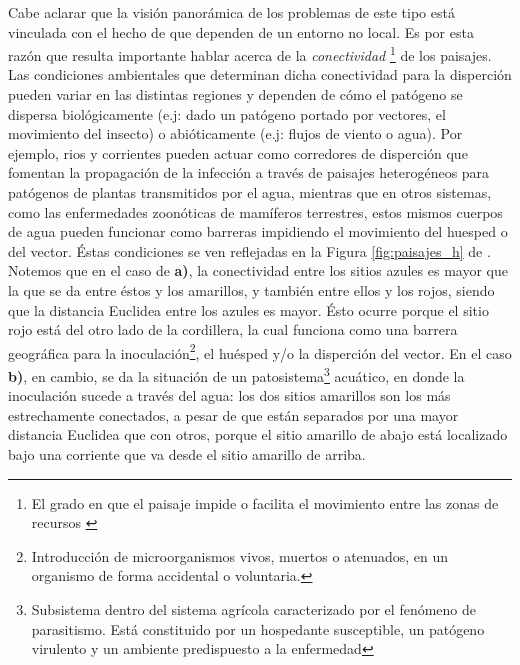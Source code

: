 \par Cabe aclarar que la visión panorámica de los problemas de este tipo está
  vinculada con el hecho de que dependen de un entorno no local. Es por esta
  razón que resulta importante hablar acerca de la \textit{conectividad}
  \footnote{El grado en que el paisaje impide o facilita el movimiento
  entre las zonas de recursos \cite{landscape_connectivity}} de los paisajes.
  Las condiciones ambientales que determinan dicha conectividad
  para la disperción pueden variar en las distintas regiones y dependen de cómo
  el patógeno se dispersa biológicamente (e.j: dado un patógeno portado por
  vectores, el movimiento del insecto) o abióticamente (e.j: flujos de viento o agua).
  Por ejemplo, rios y corrientes pueden actuar como corredores de disperción que
  fomentan la propagación de la infección a través de paisajes heterogéneos
  para patógenos de plantas transmitidos por el agua, mientras que en otros
  sistemas, como las enfermedades zoonóticas de mamíferos terrestres, estos mismos
  cuerpos de agua pueden funcionar como barreras impidiendo el movimiento
  del huesped o del vector. Éstas condiciones se ven reflejadas en la
  Figura \ref{fig:paisajes_h} de \cite{landscape_epidemiology}.
  Notemos que en el caso de \textbf{a)}, la
  conectividad entre los sitios azules es mayor que la que se da entre éstos y
  los amarillos, y también entre ellos y los rojos, siendo que la distancia
  Euclidea entre los azules es mayor. Ésto ocurre porque el sitio rojo está del otro lado
  de la cordillera, la cual funciona como una barrera geográfica para la
  inoculación\footnote{Introducción de microorganismos vivos, muertos o atenuados,
  en un organismo de forma accidental o voluntaria.}, el huésped y/o la disperción
  del vector. En el caso \textbf{b)}, en cambio, se da la situación de un
  patosistema\footnote{Subsistema dentro del sistema agrícola caracterizado por el
  fenómeno de parasitismo. Está constituido por un hospedante susceptible,
  un patógeno virulento y un ambiente predispuesto a la enfermedad} acuático, en
  donde la inoculación sucede a través del agua: los dos sitios amarillos son los
  más estrechamente conectados, a pesar de que están separados por una mayor
  distancia Euclidea que con otros, porque el sitio amarillo de abajo está localizado
  bajo una corriente que va desde el sitio amarillo de arriba.

